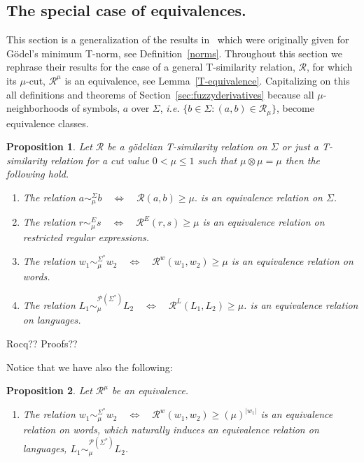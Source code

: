 \documentclass{article}
\def\ie{{\em i.e. }}
\newcommand{\cR}{{\mathcal R}}
\def\cut{\mu}
\newtheorem{proposition}{Proposition}[section]
\begin{document}
\subsection{The special case of equivalences.}
This section is a generalization of the results in~\cite{KM26} which were originally given for G\"odel's minimum T-norm, see Definition~\ref{norms}. 
Throughout this section we rephrase their results for the case of a general T-similarity relation, $\cR$, for which its $\mu$-cut, $\cR^\mu$ is an equivalence, see Lemma~\ref{T-equivalence}. Capitalizing on this all definitions and theorems of Section~\ref{sec:fuzzyderivatives} because all $\mu$-neighborhoods of symbols, $a$ over $\Sigma$, \ie $\{b \in\Sigma : (a,b)\in\mathcal{R}_\cut\}$, become equivalence classes. 

\begin{proposition}\label{prop:cut-equivalence}
Let $\cR$ be a g\"odelian T-similarity relation on $\Sigma$ or just a T-similarity relation for a cut value $0 < \cut \le 1$ such that $\mu\otimes\mu=\mu$ then 
the following hold. 
\begin{enumerate}
\item The relation $
  a \sim_\cut^\Sigma b \quad\Longleftrightarrow\quad \cR(a,b)\ge \cut.
$ is an equivalence relation on $\Sigma$. 
\item The relation $
  r\sim_\cut^E s
  \quad\Longleftrightarrow\quad
  \mathcal R^E(r,s)\ge\cut
$
 is an equivalence relation on restricted regular expressions.
\item The relation $
  w_1\sim_\cut^{\Sigma^*}w_2
  \quad\Longleftrightarrow\quad
  \mathcal R^w(w_1,w_2)\ge\cut $
 is an equivalence relation on words.
\item The relation $
  L_1\sim_\cut^{\mathcal P(\Sigma^*)}L_2
  \quad\Longleftrightarrow\quad
  \mathcal R^L(L_1,L_2)\ge\cut$.
is an equivalence relation on languages. 
\end{enumerate}
\end{proposition}

{\color{red} Rocq?? Proofs??}\vspace{1 cm}

{\color{red}Notice that we have also the following: 
\begin{proposition}\label{prop:cut-equivalence-notice}
Let $\cR^\mu$ be an equivalence.
\begin{enumerate}
\item The relation $
  w_1\sim_\cut^{\Sigma^*}w_2
  \quad\Longleftrightarrow\quad
  \mathcal R^w(w_1,w_2)\ge(\cut)^{|w_1|} $
 is an equivalence relation on words, which naturally induces an equivalence relation on languages, $
  L_1\sim_\cut^{\mathcal P(\Sigma^*)}L_2$.
\end{enumerate}
\end{proposition}} 
\end{document}
